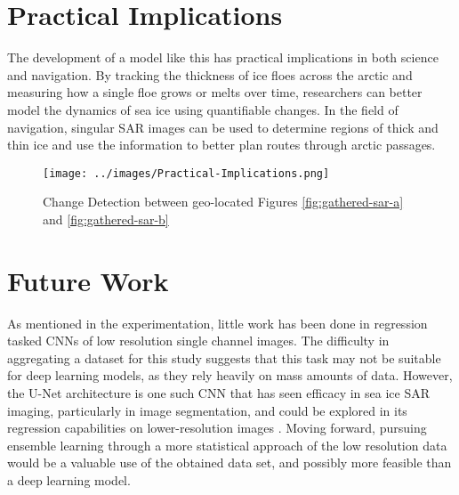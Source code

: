 \section{Practical Implications}
The development of a model like this has practical implications in both science and navigation. By tracking the thickness of ice floes across the arctic and measuring how a single floe grows or melts over time, researchers can better model the dynamics of sea ice using quantifiable changes. In the field of navigation, singular SAR images can be used to determine regions of thick and thin ice and use the information to better plan routes through arctic passages. 
\begin{figure}[h]
	\centering
	\texttt{[image: ../images/Practical-Implications.png]}
	\caption[Implications of LiDAR mapped SAR]{Change Detection between geo-located Figures \ref{fig:gathered-sar-a} and \ref{fig:gathered-sar-b}}
	\label{fig:change-detection}
\end{figure}


\section{Future Work}
As mentioned in the experimentation, little work has been done in regression tasked CNNs of low resolution single channel images. The difficulty in aggregating a dataset for this study suggests that this task may not be suitable for deep learning models, as they rely heavily on mass amounts of data. However, the U-Net architecture is one such CNN that has seen efficacy in sea ice SAR imaging, particularly in image segmentation, and could be explored in its regression capabilities on lower-resolution images \cite{SAR-U-Net}. Moving forward, pursuing ensemble learning through a more statistical approach of the low resolution data would be a valuable use of the obtained data set, and possibly more feasible than a deep learning model.
